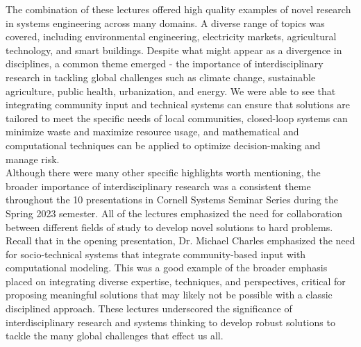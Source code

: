 \documentclass[11pt]{article}
\begin{document}
The combination of these lectures offered high quality examples of novel research in systems engineering across many domains. A diverse range of topics was covered, including environmental engineering, electricity markets, agricultural technology, and smart buildings. Despite what might appear as a divergence in disciplines, a common theme emerged - the importance of interdisciplinary research in tackling global challenges such as climate change, sustainable agriculture, public health, urbanization, and energy. We were able to see that integrating community input and technical systems can ensure that solutions are tailored to meet the specific needs of local communities, closed-loop systems can minimize waste and maximize resource usage, and mathematical and computational techniques can be applied to optimize decision-making and manage risk.\\

Although there were many other specific highlights worth mentioning, the broader importance of interdisciplinary research was a consistent theme throughout the 10 presentations in Cornell Systems Seminar Series during the Spring 2023 semester. All of the lectures emphasized the need for collaboration between different fields of study to develop novel solutions to hard problems. Recall that in the opening presentation, Dr. Michael Charles emphasized the need for socio-technical systems that integrate community-based input with computational modeling. This was a good example of the broader emphasis placed on integrating diverse expertise, techniques, and perspectives, critical for proposing meaningful solutions that may likely not be possible with a classic disciplined approach. These lectures underscored the significance of interdisciplinary research and systems thinking to develop robust solutions to tackle the many global challenges that effect us all.\\
\end{document}

